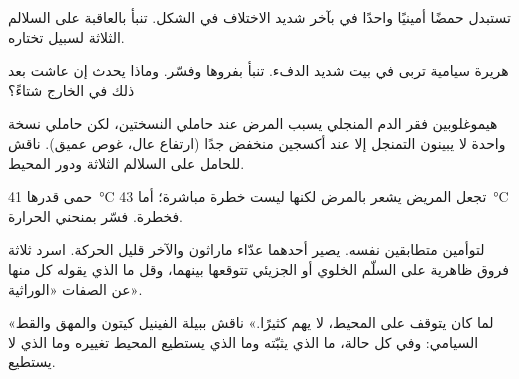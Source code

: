 \begin{exercise}[$\star\star$]\label{exo:g11:enzymes-and-phenotype:10}
 تستبدل حمضًا أمينيًا واحدًا في   بآخر شديد
الاختلاف في الشكل. تنبأ بالعاقبة على السلالم الثلاثة لسبيل تختاره.
\end{exercise}

\begin{exercise}[$\star\star$]\label{exo:g11:enzymes-and-phenotype:11}
هريرة سيامية تربى في بيت شديد الدفء. تنبأ بفروها وفسّر. وماذا يحدث إن
عاشت بعد ذلك في الخارج شتاءً؟
\end{exercise}

\begin{exercise}[$\star\star\star$]\label{exo:g11:enzymes-and-phenotype:12}
هيموغلوبين فقر الدم المنجلي يسبب المرض عند حاملي النسختين، لكن حاملي
نسخة واحدة لا يبينون التمنجل إلا عند أكسجين منخفض جدًا (ارتفاع عال،
غوص عميق). ناقش  للحامل على السلالم الثلاثة ودور المحيط.
\end{exercise}

\begin{exercise}[$\star\star\star$]\label{exo:g11:enzymes-and-phenotype:13}
حمى قدرها \qty{41}{\celsius} تجعل المريض يشعر بالمرض لكنها ليست خطرة
مباشرة؛ أما \qty{43}{\celsius} فخطرة. فسّر بمنحني الحرارة.
\end{exercise}

\begin{exercise}[$\star\star\star$]\label{exo:g11:enzymes-and-phenotype:14}
لتوأمين متطابقين  نفسه. يصير أحدهما عدّاء ماراثون
والآخر قليل الحركة. اسرد ثلاثة فروق ظاهرية على السلّم الخلوي أو
الجزيئي تتوقعها بينهما، وقل ما الذي يقوله كل منها عن الصفات
«الوراثية».
\end{exercise}

\begin{exercise}[$\star\star\star$]\label{exo:g11:enzymes-and-phenotype:15}
«لما كان  يتوقف على المحيط،  لا يهم
كثيرًا.» ناقش ببيلة الفينيل كيتون والمهق والقط السيامي: وفي كل حالة،
ما الذي يثبّته  وما الذي يستطيع المحيط تغييره وما الذي لا
يستطيع.
\end{exercise}

